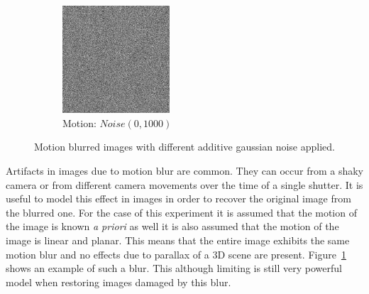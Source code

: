 \documentclass[letterpaper]{article}
\begin{document}
\begin{figure}[hbtp]
\begin{subfigure}{4cm}
  \end{subfigure}
  \begin{subfigure}{4cm}
    \includegraphics[width=4cm]{images/lenna_blur_1000.png}
    \caption{Motion: $Noise(0,1000)$}
  \end{subfigure}
  \caption{Motion blurred images with different additive gaussian noise applied.}
  \label{fig:motion}
\end{figure}
Artifacts in images due to motion blur are common. They can occur from a shaky camera or from different camera movements over the time of a single shutter. It is useful to model this effect in images in order to recover the original image from the blurred one. For the case of this experiment it is assumed that the motion of the image is known \emph{a priori} as well it is also assumed that the motion of the image is linear and planar. This means that the entire image exhibits the same motion blur and no effects due to parallax of a 3D scene are present. Figure~\ref{fig:motion} shows an example of such a blur. This although limiting is still very powerful model when restoring images damaged by this blur.
\end{document}

